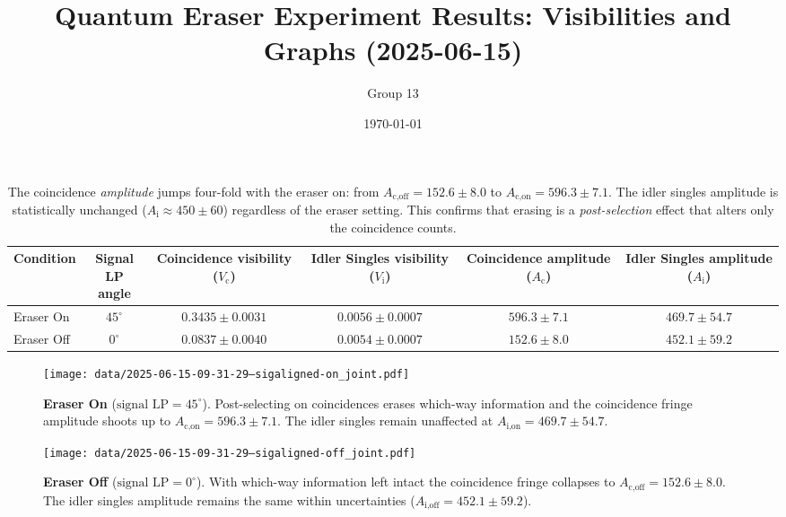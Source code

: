 \documentclass{article}
\title{Quantum Eraser Experiment Results: Visibilities and Graphs (2025-06-15)}
\author{Group 13} %
\date{\today}
\begin{document}
\pagestyle{empty} %

\begin{table*}[t]
\centering
\begin{tabular}{lccccc}
\toprule
Condition & \makecell{Signal \\ LP angle} & \makecell{Coincidence \\ visibility ($V_{\text{c}}$)} & \makecell{Idler Singles \\ visibility ($V_{\text{i}}$)} & \makecell{Coincidence \\ amplitude ($A_{\text{c}}$)} & \makecell{Idler Singles \\ amplitude ($A_{\text{i}}$)} \\
\midrule
Eraser On   & $45^\circ$ & $0.3435 \pm 0.0031$ & $0.0056 \pm 0.0007$ & $596.3 \pm 7.1$ & $469.7 \pm 54.7$ \\
Eraser Off  & $0^\circ$  & $0.0837 \pm 0.0040$ & $0.0054 \pm 0.0007$ & $152.6 \pm 8.0$ & $452.1 \pm 59.2$ \\
\bottomrule
\end{tabular}
\caption*{
  The coincidence \emph{amplitude} jumps four-fold with the eraser on: 
  from $A_{\text{c,off}} = 152.6 \pm 8.0$ to
  $A_{\text{c,on}} = 596.3 \pm 7.1$. 
  The idler singles amplitude is statistically unchanged 
  ($A_{\text{i}} \approx 450 \pm 60$) regardless of the eraser setting. 
  This confirms that erasing is a \emph{post-selection} effect that
  alters only the coincidence counts.
}
\end{table*}

\begin{figure}[h!]
\centering
\texttt{[image: data/2025-06-15-09-31-29--sigaligned-on\_joint.pdf]}
\caption*{
  \textbf{Eraser On} ($\text{signal LP}=45^\circ$).  Post-selecting on coincidences
  erases which-way information and the coincidence fringe amplitude shoots up to
  $A_{\text{c,on}} = 596.3 \pm 7.1$.
  The idler singles remain unaffected at
  $A_{\text{i,on}} = 469.7 \pm 54.7$.
}
\end{figure}

\begin{figure}[h!]
\centering
\texttt{[image: data/2025-06-15-09-31-29--sigaligned-off\_joint.pdf]}
\caption*{
  \textbf{Eraser Off} ($\text{signal LP}=0^\circ$).  With which-way information left
  intact the coincidence fringe collapses to
  $A_{\text{c,off}} = 152.6 \pm 8.0$.
  The idler singles amplitude remains the same within uncertainties
  ($A_{\text{i,off}} = 452.1 \pm 59.2$).
}
\end{figure}
\end{document}
